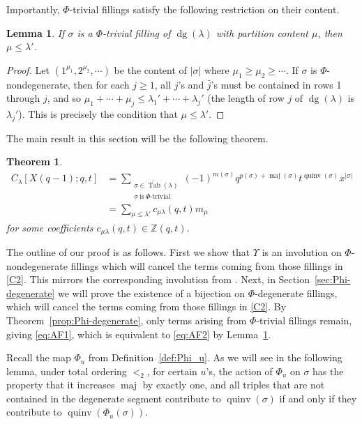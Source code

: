 \documentclass[11pt]{article}
\newtheorem{theorem}[theo]{Theorem}
\newtheorem{lemma}[theo]{Lemma}
\theoremstyle{definition}
\numberwithin{equation}{section}
\DeclareMathOperator{\PQT}{Tab}
\DeclareMathOperator{\dg}{dg}
\DeclareMathOperator{\maj}{maj}
\DeclareMathOperator{\quinv}{quinv}
\begin{document}
Importantly, $\Phi$-trivial fillings satisfy the following restriction on their content.

\begin{lemma}\label{lem:phitrivialm}
If $\sigma$ is a $\Phi$-trivial filling of $\dg(\lambda)$ with partition content $\mu$, then $\mu \leq \lambda'$.
\end{lemma}

\begin{proof}
Let $(1^{\mu_1},2^ {\mu_2},\cdots)$ be the content of $|\sigma|$ where $\mu_1\geq \mu_2\geq \cdots$. If $\sigma$ is $\Phi$-nondegenerate, then for each $j \geq 1$, all $j$'s and $\bar{j}$'s must be contained in rows 1 through $j$, and so $\mu_1+\cdots+\mu_j \leq \lambda_1'+\cdots+\lambda_j'$ (the length of row $j$ of $\dg(\lambda)$ is $\lambda_j'$). This is precisely the condition that $\mu\leq \lambda'$.
\end{proof}


The main result in this section will be the following theorem.

\begin{theorem}\label{thm:A2FP}
\begin{align}
C_{\lambda}[X(q-1);q,t]& = \sum_{\substack{\sigma\in\widetilde{\PQT}(\lambda)\\\sigma\ \text{is}\ \Phi\text{-trivial}}} (-1)^{m(\sigma)} q^{p(\sigma)+\maj(\sigma)}t^{\quinv(\sigma)}x^{|\sigma|}\label{eq:AF1}\\
&=\sum_{\mu \leq \lambda'} c_{\mu\lambda}(q,t)m_{\mu}\label{eq:AF2}
\end{align}
for some coefficients $c_{\mu\lambda}(q,t)\in\mathbb{Z}(q,t)$.
\end{theorem}

The outline of our proof is as follows. First we show that $\Upsilon$ is an involution on $\Phi$-nondegenerate fillings which will cancel the terms coming from those fillings in \eqref{C2}. This mirrors the corresponding involution from \cite[Section 5.2]{HHL05}. Next, in Section~\ref{sec:Phi-degenerate} we will prove the existence of a bijection on $\Phi$-degenerate fillings, which will cancel the terms coming from those fillings in \eqref{C2}. By Theorem~\ref{prop:Phi-degenerate}, only terms arising from $\Phi$-trivial fillings remain, giving \eqref{eq:AF1}, which is equivalent to \eqref{eq:AF2} by Lemma~\ref{lem:phitrivialm}.

Recall the map $\Phi_u$ from Definition~\ref{def:Phi_u}. As we will see in the following lemma, under total ordering $<_2$, for certain $u$'s, the action of $\Phi_u$ on $\sigma$ has the property that it increases $\maj$ by exactly one, and all triples that are not contained in the degenerate segment contribute to $\quinv(\sigma)$ if and only if they contribute to $\quinv(\Phi_u(\sigma))$.
\end{document}
